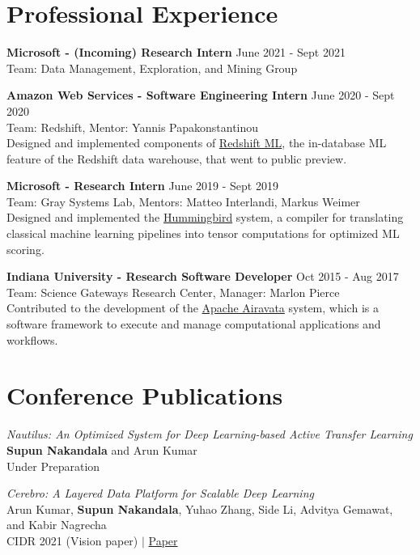 \documentclass[margin]{res}
\begin{document}
\begin{resume}
\vspace{-4mm}
\section{Professional Experience}

\textbf{Microsoft - (Incoming) Research Intern}
\hfill June 2021 - Sept 2021 \\
Team: Data Management, Exploration, and Mining Group

\textbf{Amazon Web Services - Software Engineering Intern}
\hfill June 2020 - Sept 2020 \\
Team: Redshift, Mentor: Yannis Papakonstantinou\\
Designed and implemented components of \href{https://aws.amazon.com/redshift/features/redshift-ml/}{Redshift ML}, the in-database ML feature of the Redshift data warehouse, that went to public preview.

\textbf{Microsoft - Research Intern}
\hfill June 2019 - Sept 2019 \\
Team: Gray Systems Lab, Mentors: Matteo Interlandi, Markus Weimer\\
Designed and implemented the \href{https://github.com/microsoft/hummingbird}{Hummingbird} system, a compiler for translating classical machine learning pipelines into tensor computations for optimized ML scoring.

\textbf{Indiana University - Research Software Developer}
\hfill Oct 2015 - Aug 2017 \\
Team: Science Gateways Research Center, Manager: Marlon Pierce\\
Contributed to the development of the \href{https://airavata.apache.org/index.html}{Apache Airavata} system, which is a software framework to execute and manage computational applications and workflows.


\section{Conference Publications}
\par
\textit{Nautilus: An Optimized System for Deep Learning-based Active Transfer Learning} \\
\textbf{Supun Nakandala} and Arun Kumar\\
Under Preparation

\par
\textit{Cerebro: A Layered Data Platform for Scalable Deep Learning} \\
Arun Kumar, \textbf{Supun Nakandala}, Yuhao Zhang,  Side Li, Advitya Gemawat, and Kabir
Nagrecha\\
CIDR 2021 (Vision paper) $|$ \href{https://adalabucsd.github.io/papers/2021_Cerebro_CIDR.pdf}{Paper}


\end{resume}
\end{document}
